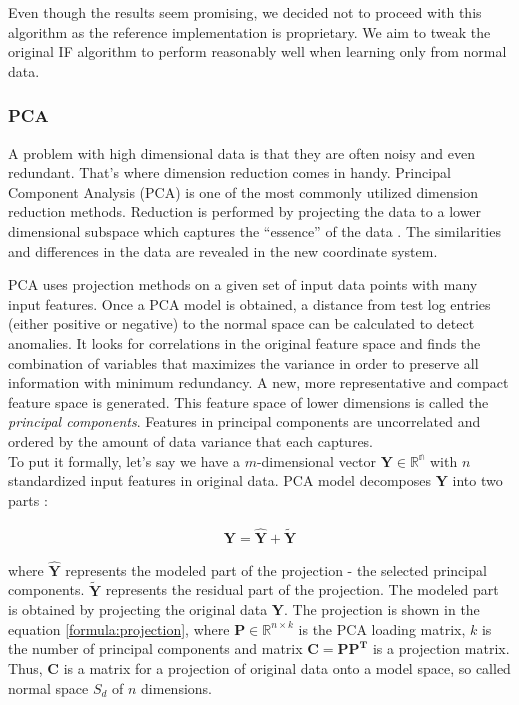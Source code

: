 Even though the results seem promising, we decided not to proceed with this algorithm as the reference implementation is proprietary.
We aim to tweak the original IF algorithm to perform reasonably well when learning only from normal data.
 
 \subsubsection{PCA}
 \label{section:lrPCA}
 A problem with high dimensional data is that they are often noisy and even redundant. That's where dimension reduction comes in handy. Principal Component Analysis (PCA) is one of the most commonly utilized dimension reduction methods. Reduction is performed by projecting the data to a lower dimensional subspace which captures the “essence” of the data \cite{murphy2013machine}. The similarities and differences in the data are revealed in the new coordinate system. 
 
 PCA uses projection methods on a given set of input data points with many input features. Once a PCA model is obtained, a distance from test log entries (either positive or negative) to the normal space can be calculated to detect anomalies. It looks for correlations in the original feature space and finds the combination of variables that maximizes the variance in order to preserve all information with minimum redundancy. A new, more representative and compact feature space is generated. This feature space of lower dimensions is called the \textit{principal components}. Features in principal components are uncorrelated and ordered by the amount of data variance that each captures.\\
 
 To put it formally, let's say we have a $m$-dimensional vector $\mathbf{Y} \in \mathbb{R^n}$ with $n$ standardized input features in original data. PCA model decomposes $\mathbf{Y}$ into two parts \cite{pca1997}: 
 
 \begin{gather}
     \mathbf{Y} = \mathbf{\hat{Y}} + \mathbf{\widetilde{Y}}
 \end{gather}
 
 where $\mathbf{\hat{Y}}$ represents the modeled part of the projection - the selected principal components. $\mathbf{\widetilde{Y}}$ represents the residual part of the projection. The modeled part is obtained by projecting the original data $\mathbf{{Y}}$. The projection is shown in the equation \ref{formula:projection}, where $\mathbf{P} \in \mathbb{R}^{n \times k}$ is the PCA loading matrix, $k$ is the number of principal components and matrix $\mathbf{C = \mathbf{PP}^T}$ is a projection matrix. Thus, $\mathbf{C}$ is a matrix for a projection of original data onto a model space, so called normal space $S_d$ of $n$ dimensions.

